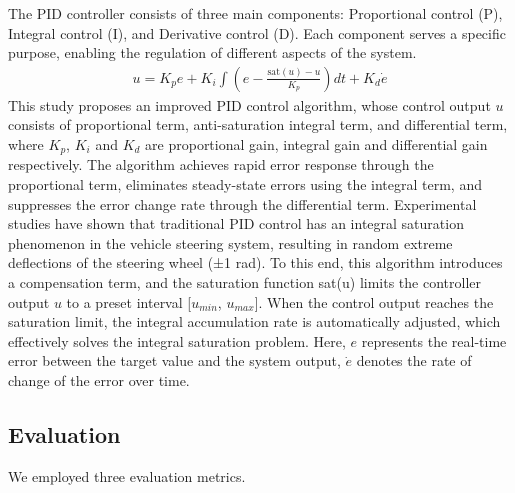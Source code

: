 \documentclass[journal,twoside,web]{ieeecolor}
\begin{document}
The PID controller consists of three main components: Proportional control (P), Integral control (I), and Derivative control (D). Each component serves a specific purpose, enabling the regulation of different aspects of the system.
\begin{align}
	u = K_p e + K_i \int \left( e - \frac{\text{sat}(u)-u}{K_p} \right) dt + K_d \dot{e}
\end{align}
This study proposes an improved PID control algorithm, whose control output \(u\) consists of proportional term, anti-saturation integral term, and differential term, where \(K_p\), \(K_i\) and \(K_d\) are proportional gain, integral gain and differential gain respectively.
The algorithm achieves rapid error response through the proportional term, eliminates steady-state errors using the integral term, and suppresses the error change rate through the differential term.
Experimental studies have shown that traditional PID control has an integral saturation phenomenon in the vehicle steering system, resulting in random extreme deflections of the steering wheel (±1 rad).
To this end, this algorithm introduces a compensation term, and the saturation function sat(u) limits the controller output \(u\) to a preset interval [\(u_{min}\), \(u_{max}\)].
When the control output reaches the saturation limit, the integral accumulation rate is automatically adjusted, which effectively solves the integral saturation problem.
Here, \(e\) represents the real-time error between the target value and the system output, \(\dot{e}\) denotes the rate of change of the error over time.
\subsection{Evaluation}

We employed three evaluation metrics.
\end{document}
